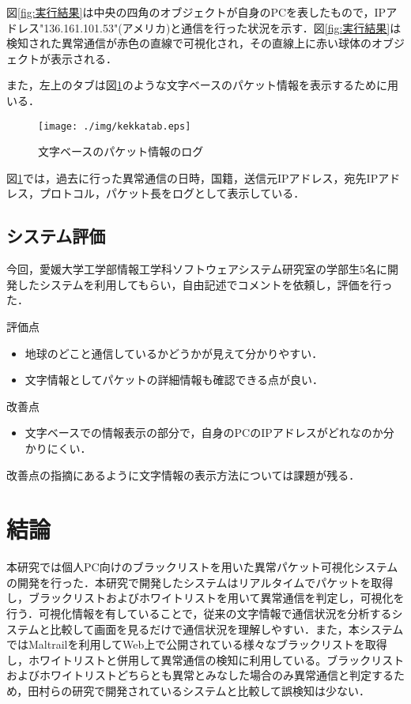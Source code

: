 \documentclass{thesis}
\begin{document}
図\ref{fig:実行結果}は中央の四角のオブジェクトが自身のPCを表したもので，IPアドレス"136.161.101.53"(アメリカ)と通信を行った状況を示す．図\ref{fig:実行結果}は検知された異常通信が赤色の直線で可視化され，その直線上に赤い球体のオブジェクトが表示される．

また，左上のタブは図\ref{fig:文字ベース}のような文字ベースのパケット情報を表示するために用いる．

\begin{figure}[H]
 \center
 \texttt{[image: ./img/kekkatab.eps]}
 \caption{文字ベースのパケット情報のログ}
 \label{fig:文字ベース}
\end{figure}

図\ref{fig:文字ベース}では，過去に行った異常通信の日時，国籍，送信元IPアドレス，宛先IPアドレス，プロトコル，パケット長をログとして表示している．

\section{システム評価}

今回，愛媛大学工学部情報工学科ソフトウェアシステム研究室の学部生5名に開発したシステムを利用してもらい，自由記述でコメントを依頼し，評価を行った．

評価点

\begin{itemize}
	\item 地球のどこと通信しているかどうかが見えて分かりやすい．
	\item 文字情報としてパケットの詳細情報も確認できる点が良い．
\end{itemize}

改善点

\begin{itemize}
	\item 文字ベースでの情報表示の部分で，自身のPCのIPアドレスがどれなのか分かりにくい．
\end{itemize}

改善点の指摘にあるように文字情報の表示方法については課題が残る．

\chapter{結論}

本研究では個人PC向けのブラックリストを用いた異常パケット可視化システムの開発を行った．本研究で開発したシステムはリアルタイムでパケットを取得し，ブラックリストおよびホワイトリストを用いて異常通信を判定し，可視化を行う．可視化情報を有していることで，従来の文字情報で通信状況を分析するシステムと比較して画面を見るだけで通信状況を理解しやすい．また，本システムではMaltrailを利用してWeb上で公開されている様々なブラックリストを取得し，ホワイトリストと併用して異常通信の検知に利用している。ブラックリストおよびホワイトリストどちらとも異常とみなした場合のみ異常通信と判定するため，田村らの研究で開発されているシステムと比較して誤検知は少ない．
\end{document}
